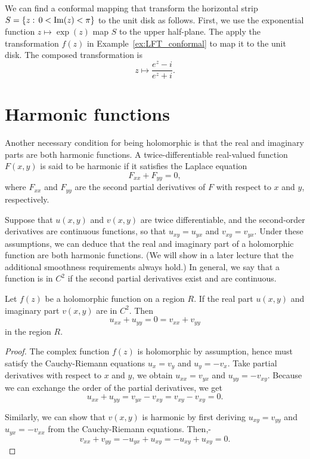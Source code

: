 \begin{example}
We can find a conformal mapping that transform the horizontal strip $S = \{z:\, 0< \operatorname{\mathrm{Im}}(z) < \pi\}$ to the unit disk as follows. First, we use the exponential function $z\mapsto \exp(z)$ map $S$ to the upper half-plane.  The apply the transformation $f(z)$ in Example~\ref{ex:LFT_conformal} to map it to the unit disk. The composed transformation is
$$
z \mapsto \frac{e^z -  i}{e^z+i}.
$$
\end{example}




\section{Harmonic functions}

Another necessary condition for being holomorphic is that the real and imaginary parts are both harmonic functions. A twice-differentiable real-valued function $F(x,y)$ is said to be harmonic if it satisfies the Laplace equation
$$
F_{xx} +F_{yy} = 0,
$$
where $F_{xx}$ and $F_{yy}$ are the second partial derivatives of $F$ with respect to $x$ and $y$, respectively.

Suppose that $u(x,y)$ and $v(x,y)$ are twice differentiable, and the second-order derivatives are continuous functions, so that $u_{xy} = u_{yx}$ and $v_{xy} = v_{yx}$. Under these assumptions, we can deduce that the real and imaginary part of a holomorphic function are both harmonic functions. (We will show in a later lecture that the additional smoothness requirements always hold.) In general, we say that a function is in $C^2$ if the  second partial derivatives exist and are continuous.

\begin{svgraybox}
	\begin{theorem}
		Let $f(z)$ be a holomorphic function on a region $R$. If the real part $u(x,y)$ and imaginary part $v(x,y)$ are in $C^2$. Then
		$$
		u_{xx} + u_{yy} = 0 = v_{xx} + v_{yy}
		$$
		in the region $R$.
	\end{theorem}
\end{svgraybox}


\begin{proof}
	The complex function $f(z)$ is holomorphic by assumption, hence must satisfy the Cauchy-Riemann equations $u_x=v_y$ and $u_y = -v_x$. Take partial derivatives with respect to $x$ and $y$,  we obtain $u_{xx}=v_{yx}$ and $u_{yy} = - v_{xy}$. Because we can exchange the order of the partial derivatives, we get
	$$
	u_{xx}+u_{yy}  = v_{yx}-v_{xy} = v_{xy} - v_{xy} = 0.
	$$
	
	Similarly, we can show that $v(x,y)$ is harmonic by first deriving $u_{xy} = v_{yy}$ and $u_{yx} = -v_{xx} $ from the Cauchy-Riemann equations. Then,-
	$$
	v_{xx}+v_{yy}  = -u_{yx}+u_{xy} = -u_{xy} + u_{xy} = 0.
	$$
\end{proof}

